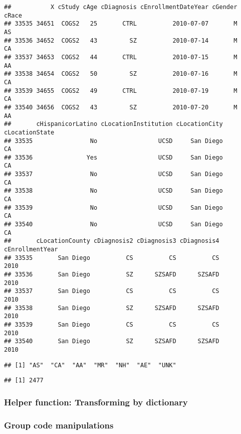\documentclass[
]{article}
\begin{document}
\begin{verbatim}
##           X cStudy cAge cDiagnosis cEnrollmentDateYear cGender cRace
## 33535 34651  COGS2   25       CTRL          2010-07-07       M    AS
## 33536 34652  COGS2   43         SZ          2010-07-14       M    CA
## 33537 34653  COGS2   44       CTRL          2010-07-15       M    AA
## 33538 34654  COGS2   50         SZ          2010-07-16       M    CA
## 33539 34655  COGS2   49       CTRL          2010-07-19       M    CA
## 33540 34656  COGS2   43         SZ          2010-07-20       M    AA
##       cHispanicorLatino cLocationInstitution cLocationCity cLocationState
## 33535                No                 UCSD     San Diego             CA
## 33536               Yes                 UCSD     San Diego             CA
## 33537                No                 UCSD     San Diego             CA
## 33538                No                 UCSD     San Diego             CA
## 33539                No                 UCSD     San Diego             CA
## 33540                No                 UCSD     San Diego             CA
##       cLocationCounty cDiagnosis2 cDiagnosis3 cDiagnosis4 cEnrollmentYear
## 33535       San Diego          CS          CS          CS            2010
## 33536       San Diego          SZ      SZSAFD      SZSAFD            2010
## 33537       San Diego          CS          CS          CS            2010
## 33538       San Diego          SZ      SZSAFD      SZSAFD            2010
## 33539       San Diego          CS          CS          CS            2010
## 33540       San Diego          SZ      SZSAFD      SZSAFD            2010
\end{verbatim}

\begin{verbatim}
## [1] "AS"  "CA"  "AA"  "MR"  "NH"  "AE"  "UNK"
\end{verbatim}

\begin{verbatim}
## [1] 2477
\end{verbatim}

\hypertarget{helper-function-transforming-by-dictionary}{%
\subsubsection{Helper function: Transforming by
dictionary}\label{helper-function-transforming-by-dictionary}}

\hypertarget{group-code-manipulations}{%
\subsubsection{Group code
manipulations}\label{group-code-manipulations}}
\end{document}
